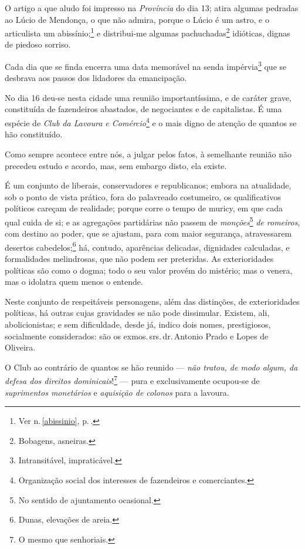 {O artigo a que aludo foi impresso na \emph{Província} do dia 13; atira
algumas pedradas ao Lúcio de Mendonça, o que não admira, porque o Lúcio
é um astro, e o articulista um abissínio;\footnote{Ver n.\,\ref{abissinio}, p.\,\pageref{abissinio}.} e distribui-me algumas pachuchadas\footnote{
  Bobagens, asneiras.} idióticas, dignas de piedoso sorriso.

Cada dia que se finda encerra uma data memorável na senda
impérvia\footnote{Intransitável, impraticável.} que se desbrava aos
passos dos lidadores da emancipação.

No dia 16 deu-se nesta cidade uma reunião importantíssima, e de caráter
grave, constituída de fazendeiros abastados, de negociantes e de
capitalistas. É uma espécie de \emph{Club da Lavoura e
Comércio}\footnote{Organização social dos interesses de fazendeiros e
  comerciantes.} e o mais digno de atenção de quantos se hão
constituído.

Como sempre acontece entre nós, a julgar pelos fatos, à semelhante
reunião não precedeu estudo e acordo, mas, sem embargo disto, ela
existe.

É um conjunto de liberais, conservadores e republicanos; embora na
atualidade, sob o ponto de vista prático, fora do palavreado costumeiro,
os qualificativos políticos careçam de realidade; porque corre o tempo
de muricy, em que cada qual cuida de si; e as agregações partidárias não
passem de \emph{monções}\footnote{No sentido de ajuntamento ocasional.}
\emph{de romeiros}, com destino ao poder, que se ajustam, para com maior
segurança, atravessarem desertos cabedelos;\footnote{Dunas, elevações
  de areia.} há, contudo, aparências delicadas, dignidades calculadas,
e formalidades melindrosas, que não podem ser preteridas. As
exterioridades políticas são como o dogma; todo o seu valor provém do
mistério; mas o venera, mas o idolatra quem menos o entende.

Neste conjunto de respeitáveis personagens, além das distinções, de
exterioridades políticas, há outras cujas gravidades se não pode
dissimular. Existem, ali, abolicionistas; e sem dificuldade, desde já,
indico dois nomes, prestigiosos, socialmente considerados: são os exmos.\,srs.\,dr.\,Antonio Prado e Lopes de Oliveira.

O Club ao contrário de quantos se hão reunido --- \emph{não tratou, de
modo algum, da defesa dos direitos dominicais}!\footnote{O mesmo que
  senhoriais.} --- pura e exclusivamente ocupou-se de \emph{suprimentos
monetários} e \emph{aquisição de colonos} para a lavoura.

}
